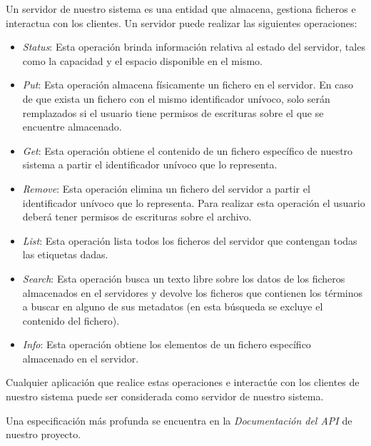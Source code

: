 \documentclass{article}
\begin{document}
Un servidor de nuestro sistema es una entidad que almacena, gestiona ficheros
e interactua con los clientes. Un servidor puede realizar las siguientes
operaciones:

\begin{itemize}
  \item \emph{Status}: Esta operación brinda información relativa al estado del
  servidor, tales como la capacidad y el espacio disponible en el mismo.
  \item \emph{Put}: Esta operación almacena físicamente un fichero en el 
  servidor. En caso de que exista un fichero con el mismo identificador
  unívoco, solo serán remplazados si el usuario tiene permisos de escrituras
  sobre el que se encuentre almacenado.
  \item \emph{Get}: Esta operación obtiene el contenido de un fichero específico
  de nuestro sistema a partir el identificador unívoco que lo representa.
  \item \emph{Remove}: Esta operación elimina un fichero del servidor a partir
  el identificador unívoco que lo representa. Para realizar esta operación el
  usuario deberá tener permisos de escrituras sobre el archivo.
  \item \emph{List}: Esta operación lista todos los ficheros del servidor que
  contengan todas las etiquetas dadas.
  \item \emph{Search}: Esta operación busca un texto libre sobre los datos
  de los ficheros almacenados en el servidores y devolve los ficheros que
  contienen los términos a buscar en alguno de sus metadatos (en esta búsqueda
  se excluye el contenido del fichero).
  \item \emph{Info}: Esta operación obtiene los elementos de un fichero
  específico almacenado en el servidor.
\end{itemize}

Cualquier aplicación que realice estas operaciones e interactúe con los
clientes de nuestro sistema puede ser considerada como servidor de nuestro
sistema.

Una especificación más profunda se encuentra en la \emph{Documentación del API}
de nuestro proyecto.
\end{document}

